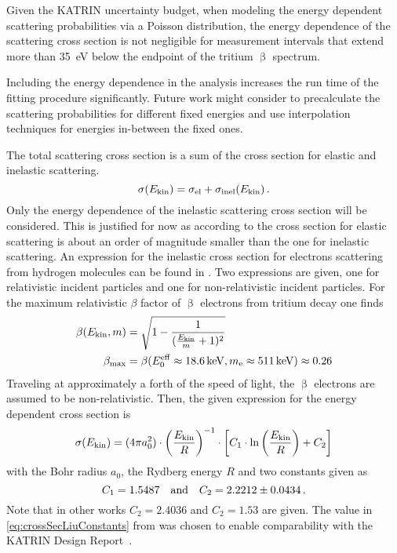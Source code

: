 Given the KATRIN uncertainty budget, when modeling the energy dependent scattering probabilities via a Poisson distribution, the energy dependence of the scattering cross section is not negligible for measurement intervals that extend more than \SI{35}{eV} below the endpoint of the tritium $\upbeta$ spectrum.

Including the energy dependence in the analysis increases the run time of the fitting procedure significantly. Future work might consider to precalculate the scattering probabilities for different fixed energies and use interpolation techniques for energies in-between the fixed ones.





The total scattering cross section is a sum of the cross section for elastic and inelastic scattering.
\begin{equation}
\sigma(E_\mathrm{kin}) = \sigma_\mathrm{el} + \sigma_\mathrm{inel}(E_\mathrm{kin})
\text{\,.}
\end{equation}
Only the energy dependence of the inelastic scattering cross section will be considered. This is justified for now as according to \cite{Angrik:2005ep} the cross section for elastic scattering is about an order of magnitude smaller than the one for inelastic scattering. An expression for the inelastic cross section for electrons scattering from hydrogen molecules can be found in \cite{Liu1973}. Two expressions are given, one for relativistic incident particles and one for non-relativistic incident particles. For the maximum relativistic $\beta$ factor of $\upbeta$ electrons from tritium decay one finds
\begin{equation}
\begin{split}
\beta(E_\mathrm{kin}, m) &= 
\sqrt{
	1-\frac{1}{
		(\frac{E_\mathrm{kin}}{m}+1)^2
	}
} \\
\beta_\mathrm{max} &= 
\beta(E_0^\mathrm{eff}\approx\SI{18.6}{keV}, m_{\mathrm{e}}\approx\SI{511}{keV})\approx0.26
\end{split}
\end{equation}
Traveling at approximately a forth of the speed of light, the $\upbeta$ electrons are assumed to be non-relativistic. Then, the given expression for the energy dependent cross section is
\begin{equation}
\label{eq:crossSecLiu}
\sigma(E_\mathrm{kin}) =  
(4 \pi a_0^2) \cdot
\left(\frac{E_\mathrm{kin}}{R}\right)^{-1} \cdot
\left[
C_1 \cdot \ln{\left(\frac{E_\mathrm{kin}}{R}\right)} + C_2
\right]
\end{equation}
with the Bohr radius $a_0$, the Rydberg energy $R$ and two constants given as
\begin{equation}
\label{eq:crossSecLiuConstants}
C_1 = 1.5487 
\quad \text{and} \quad 
C_2 = 2.2212\pm0.0434
\text{\,.}
\end{equation}
Note that in other works $C_2=2.4036$ \cite{Liu1987} and $C_2=1.53$ \cite{Gerhart1975} are given. The value in \eqref{eq:crossSecLiuConstants} from \cite{Liu1973} was chosen to enable comparability with the KATRIN Design Report~\cite{Angrik:2005ep}.

